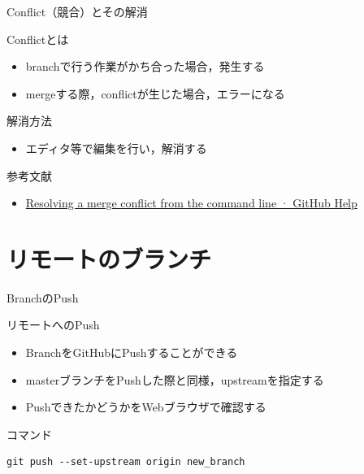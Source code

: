 \documentclass[t, aspectratio=169]{beamer}
\begin{document}
\begin{frame}[label=sec-3-2-4]{Conflict（競合）とその解消}
\begin{block}{Conflictとは}
\begin{itemize}
\item branchで行う作業がかち合った場合，発生する
\item mergeする際，conflictが生じた場合，エラーになる
\end{itemize}
\end{block}

\begin{block}{解消方法}
\begin{itemize}
\item エディタ等で編集を行い，解消する
\end{itemize}
\end{block}

\begin{block}{参考文献}
\begin{itemize}
\item \href{https://help.github.com/articles/resolving-a-merge-conflict-from-the-command-line}{Resolving a merge conflict from the command line · GitHub Help}
\end{itemize}
\end{block}
\end{frame}

\section{リモートのブランチ}
\label{sec-3-3}
\begin{frame}[fragile,label=sec-3-3-1]{BranchのPush}
 \begin{block}{リモートへのPush}
\begin{itemize}
\item BranchをGitHubにPushすることができる
\item masterブランチをPushした際と同様，upstreamを指定する
\item PushできたかどうかをWebブラウザで確認する
\end{itemize}
\end{block}
\begin{block}{コマンド}
\begin{verbatim}
git push --set-upstream origin new_branch
\end{verbatim}
\end{block}
\end{frame}
\end{document}
